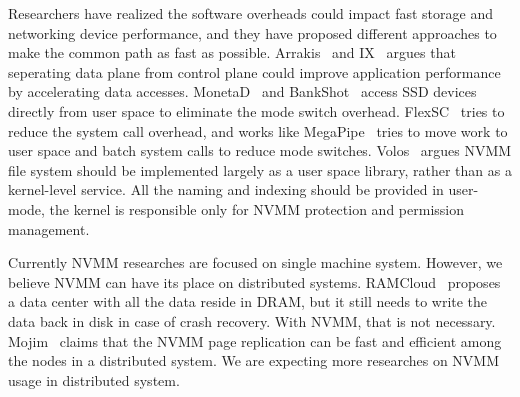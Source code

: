 Researchers have realized the software overheads could impact
fast storage and networking device performance,
and they have proposed different approaches to make the common path as fast
as possible.
Arrakis~\cite{Arrakis} and IX~\cite{IX} argues that seperating data plane
from control plane could improve application performance by accelerating
data accesses. MonetaD~\cite{monetad} and BankShot~\cite{BankShot} access
SSD devices directly from user space to eliminate the mode switch overhead.
FlexSC~\cite{FlexSC} tries to reduce the system call overhead,
and works like MegaPipe~\cite{MegaPipe} tries to move work to user space and
batch system calls to reduce mode switches. Volos~\cite{system-scm} argues
NVMM file system should be implemented largely as a user space library, rather
than as a kernel-level service. All the naming and indexing should be provided
in user-mode, the kernel is responsible only for NVMM protection and permission
management.

Currently NVMM researches are focused on single machine system. However,
we believe NVMM can have its place on distributed systems.
RAMCloud~\cite{RAMCloud} proposes a data center with all the data reside in DRAM, but it still needs to write the data back in disk in case of crash recovery.
With NVMM, that is not necessary. Mojim~\cite{mojim} claims that the NVMM page
replication can be fast and efficient among the nodes in a distributed system.
We are expecting more researches on NVMM usage in distributed system.

